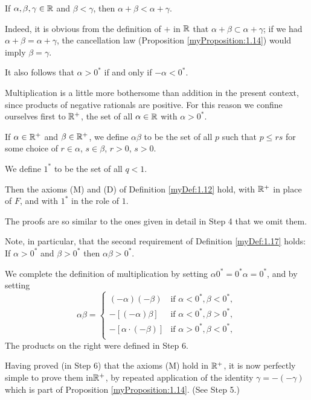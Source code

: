 If $\alpha, \beta, \gamma \in {\protect\mathbb R}$ and $\beta < \gamma$, then $\alpha + \beta < \alpha + \gamma$.

Indeed, it is obvious from the definition of $+$ in ${\protect\mathbb R}$ that $\alpha + \beta \subset \alpha + \gamma$; 
if we had $\alpha + \beta = \alpha + \gamma$, 
the cancellation law (Proposition \ref{myProposition:1.14}) would imply $\beta = \gamma$.

It also follows that $\alpha > 0^*$ if and only if $-\alpha < 0^*$.

Multiplication is a little more bothersome than addition in the present context, 
since products of negative rationals are positive. 
For this reason we confine ourselves first to ${\protect\mathbb R}^+$, 
the set of all $\alpha \in {\protect\mathbb R}$ with $\alpha > 0^*$.

If $\alpha \in {\protect\mathbb R}^+$ and $\beta \in {\protect\mathbb R}^+$, 
we define $\alpha\beta$ to be the set of all $p$ such that $p \leq rs$
for some choice of $r \in \alpha$, $s \in \beta$, $r>0$, $s>0$.

We define $1^*$ to be the set of all $q < 1$.

Then the axioms (M) and (D) of Definition \ref{myDef:1.12} hold, 
with ${\protect\mathbb R}^+$ in place of $F$, and with $1^*$ in the role of $1$.

The proofs are so similar to the ones given in detail in Step 4 that we omit them.

Note, in particular, that the second requirement of Definition \ref{myDef:1.17} holds:
If $\alpha > 0^*$ and $\beta > 0^*$ then $\alpha\beta > 0^*$.

We complete the definition of multiplication 
by setting $\alpha 0^* = 0^* \alpha = 0^*$,
and by setting
\begin{equation*}
    \alpha\beta = \left\{
        \begin{array}{ll}
            (-\alpha)(-\beta) & \text{if } \alpha < 0^*, \beta < 0^*,\\
            -[(-\alpha)\beta] & \text{if } \alpha < 0^*, \beta > 0^*,\\
            -[\alpha\cdot(-\beta)] & \text{if } \alpha > 0^*, \beta < 0^*,\\
        \end{array}
    \right.
\end{equation*}
The products on the right were defined in Step 6.

Having proved (in Step 6) that the axioms (M) hold in ${\protect\mathbb R}^+$, 
it is now perfectly simple to prove them in${\protect\mathbb R}^+$, 
by repeated application of the identity $\gamma = -(-\gamma)$ 
which is part of Proposition \ref{myProposition:1.14}. (See Step 5.)

